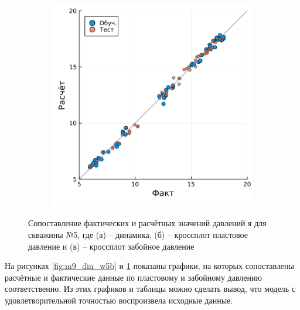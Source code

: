 \documentclass[14pt]{article}
\begin{document}
\begin{figure}[!htb]
\begin{subfigure}[b]{0.45\linewidth}
	\end{subfigure}
	\begin{subfigure}[b]{0.45\linewidth}
		\includegraphics[width=\linewidth]{pic/cppwW5}
		\caption{}
		\label{fig:m9_din_w5c}
	\end{subfigure}
	\label{fig:m9_din_w5}
	\caption{Сопоставление фактических и расчётных значений давлений я для скважины №5, где (а) -- динамика, (б) -- кроссплот пластовое давление и (в) -- кроссплот забойное давление}
\end{figure}
На рисунках \ref{fig:m9_din_w5b} и \ref{fig:m9_din_w5c} показаны графики, на которых сопоставлены расчётные и фактические данные по пластовому и забойному давлению соответственно. Из этих графиков и таблицы можно сделать вывод, что модель с удовлетворительной точностью воспроизвела исходные данные.
\end{document}
